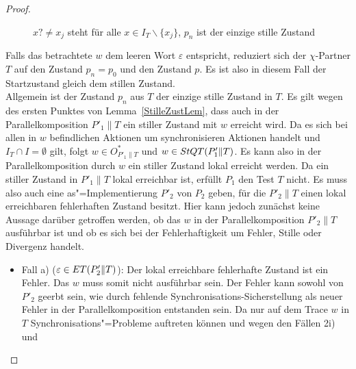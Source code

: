 \begin{proof}
\begin{figure} [h!tbp]
\begin{center}
    \caption{$x?\neq x_j$ steht für alle $x\in I_T\backslash\{x_j\}$, $p_n$
      ist der einzige stille Zustand}
    \label{TohneEmitIundO}
  \end{center}
  \end{figure}
  Falls das betrachtete $w$ dem leeren Wort $\varepsilon$ entspricht, reduziert
  sich der $\chi$-Partner $T$ auf den Zustand $p_n = p_0$ und den Zustand $p$.
  Es ist also in diesem Fall der Startzustand gleich dem stillen Zustand.\\
  Allgemein ist der Zustand $p_n$ aus $T$ der einzige stille Zustand in $T$. Es
  gilt wegen des ersten Punktes von Lemma~\ref{StilleZustLem}, dass auch in der
  Parallelkomposition $P'_1\|T$ ein stiller Zustand mit $w$ erreicht wird. Da
  es sich bei allen in $w$ befindlichen Aktionen um synchronisieren Aktionen
  handelt und $I_T\cap I=\emptyset$ gilt, folgt $w\in O_{P'_1\|T}^*$ und $w\in
  StQT (P'_1\|T)$. Es kann also in der Parallelkomposition durch $w$ ein
  stiller Zustand lokal erreicht werden. Da ein stiller Zustand in $P'_1\|T$
  lokal erreichbar ist, erfüllt $P_1$ den Test $T$ nicht. Es muss also auch
  eine as"=Implementierung $P'_2$ von $P_2$ geben, für die $P'_2\|T$ einen
  lokal erreichbaren fehlerhaften Zustand besitzt. Hier kann jedoch zunächst
  keine Aussage darüber getroffen werden, ob das $w$ in der Parallelkomposition
  $P'_2\|T$ ausführbar ist und ob es sich bei der Fehlerhaftigkeit um Fehler,
  Stille oder Divergenz handelt.
  \begin{itemize}
    \item Fall a) ($\varepsilon \in ET (P'_2\|T)$): Der lokal erreichbare
      fehlerhafte Zustand ist ein Fehler. Das $w$ muss somit nicht ausführbar
      sein. Der Fehler kann sowohl von $P'_2$ geerbt sein, wie durch fehlende
      Synchronisations-Sicherstellung als neuer Fehler in der
      Parallelkomposition entstanden sein. Da nur auf dem Trace $w$ in $T$
      Synchronisations"=Probleme auftreten können und wegen den Fällen 2i) und

\end{itemize}
\end{proof}
